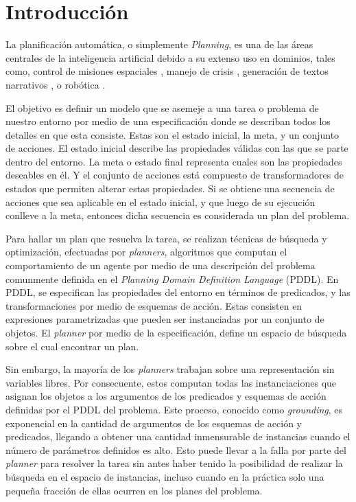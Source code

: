 \chapter{Introducción}
\label{ch:into}

La planificación automática, o simplemente \emph{Planning}, es una de las áreas
centrales de la inteligencia artificial debido a su extenso uso en dominios,
tales como, control de misiones espaciales \citep{RabideauG-et-al-2001}, manejo
de crisis \citep{Bienkowki-1995}, generación de textos narrativos
\citep{Goudoulakis-et-al-2016}, o robótica \citep{Munoz-et-al-2016}.

El objetivo es definir un modelo que se asemeje a una tarea o problema de
nuestro entorno por medio de una especificación donde se describan todos los
detalles en que esta consiste. Estas son el estado inicial, la meta, y un
conjunto de acciones. El estado inicial describe las propiedades válidas con las
que se parte dentro del entorno. La meta o estado final representa cuales son
las propiedades deseables en él. Y el conjunto de acciones está compuesto de
transformadores de estados que permiten alterar estas propiedades. Si se obtiene
una secuencia de acciones que sea aplicable en el estado inicial, y que luego de
su ejecución conlleve a la meta, entonces dicha secuencia es considerada un plan
del problema. \citep{Georgievski-et-al-2016}

Para hallar un plan que resuelva la tarea, se realizan técnicas de búsqueda y
optimización, efectuadas por \emph{planners}, algoritmos que computan el
comportamiento de un agente por medio de una descripción del problema comunmente
definida en el \emph{Planning Domain Definition Language} (PDDL). En PDDL, se
especifican las propiedades del entorno en términos de predicados, y las
transformaciones por medio de esquemas de acción. Estas consisten en expresiones
parametrizadas que pueden ser instanciadas por un conjunto de objetos. El
\emph{planner} por medio de la especificación, define un espacio de búsqueda
sobre el cual encontrar un plan.
\citep{Georgievski-et-al-2016}

Sin embargo, la mayoría de los \emph{planners} trabajan sobre una representación
sin variables libres. Por consecuente, estos computan todas las instanciaciones
que asignan los objetos a los argumentos de los predicados y esquemas de acción
definidas por el PDDL del problema. Este proceso, conocido como
\emph{grounding}, es exponencial en la cantidad de argumentos de los esquemas de
acción y predicados, llegando a obtener una cantidad inmensurable de instancias
cuando el número de parámetros definidos es alto. Esto puede llevar a la falla
por parte del \emph{planner} para resolver la tarea sin antes haber tenido la
posibilidad de realizar la búsqueda en el espacio de instancias, incluso cuando
en la práctica solo una pequeña fracción de ellas ocurren en los planes del
problema.
\citep{Gnad_Torralba_Dominguez_Areces_Bustos_2019}

